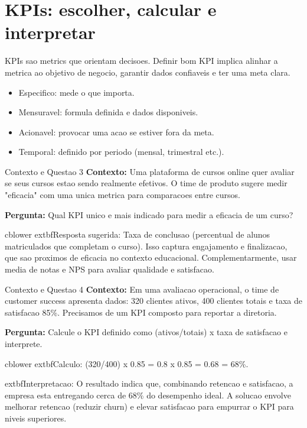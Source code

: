 \section{KPIs: escolher, calcular e interpretar}

KPIs sao metrics que orientam decisoes. Definir bom KPI implica alinhar a metrica ao objetivo de negocio, garantir dados confiaveis e ter uma meta clara.

\begin{itemize}
  \item Especifico: mede o que importa.
  \item Mensuravel: formula definida e dados disponiveis.
  \item Acionavel: provocar uma acao se estiver fora da meta.
  \item Temporal: definido por periodo (mensal, trimestral etc.).
\end{itemize}

\begin{SolvedBox}{Contexto e Questao 3}
	\textbf{Contexto:} Uma plataforma de cursos online quer avaliar se seus cursos estao sendo realmente efetivos. O time de produto sugere medir "eficacia" com uma unica metrica para comparacoes entre cursos.

	\textbf{Pergunta:} Qual KPI unico e mais indicado para medir a eficacia de um curso?

	cblower
	extbf{Resposta sugerida:} Taxa de conclusao (percentual de alunos matriculados que completam o curso). Isso captura engajamento e finalizacao, que sao proximos de eficacia no contexto educacional. Complementarmente, usar media de notas e NPS para avaliar qualidade e satisfacao.
\end{SolvedBox}

\begin{SolvedBox}{Contexto e Questao 4}
	\textbf{Contexto:} Em uma avaliacao operacional, o time de customer success apresenta dados: 320 clientes ativos, 400 clientes totais e taxa de satisfacao 85\%. Precisamos de um KPI composto para reportar a diretoria.

	\textbf{Pergunta:} Calcule o KPI definido como (ativos/totais) x taxa de satisfacao e interprete.

	cblower
	extbf{Calculo:} (320/400) x 0.85 = 0.8 x 0.85 = 0.68 = 68\%.

	extbf{Interpretacao:} O resultado indica que, combinando retencao e satisfacao, a empresa esta entregando cerca de 68\% do desempenho ideal. A solucao envolve melhorar retencao (reduzir churn) e elevar satisfacao para empurrar o KPI para niveis superiores.
\end{SolvedBox}

